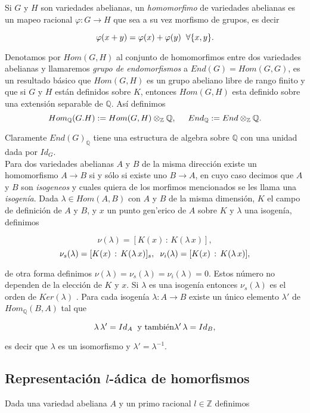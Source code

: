 \documentclass[letterpaper]{report}
\newcommand{\rac}{\ensuremath{ \mathbb Q }}
\newcommand{\dbz}{\ensuremath{ \mathbb Z }}
\begin{document}
Si $G$ y $H$ son variedades abelianas, un \textit{homomorfimo} de variedades abelianas es un mapeo racional $\varphi:G\rightarrow H$ que sea a su vez morfismo de grupos, es decir

$$\varphi(x+y)=\varphi(x)+\varphi(y)\hspace{0.2cm}\forall\lbrace x,y\rbrace.$$

Denotamos por $Hom(G,H)$ al conjunto de homomorfimos entre dos variedades abelianas y llamaremos \textit{grupo de endomorfismos} a $End(G) = Hom(G,G)$, es un resultado básico que $Hom(G,H)$ es un grupo abeliano libre de rango finito y que si $G$ y $H$ están definidos sobre $K$, entonces $Hom(G,H)$ esta definido sobre una extensión separable de $\rac$. Así definimos 
$$Hom_{\rac}(G.H):=Hom(G,H)\otimes_{\dbz}\rac,\hspace{0.5cm}End_{\rac}:=End\otimes_{\dbz}\rac.$$

Claramente $End(G)_{\rac}$ tiene una estructura de algebra sobre $\rac$ con una unidad dada por $Id_G$.\\

Para dos variedades abelianas $A$ y $B$ de la misma dirección existe un homomorfismo $A\rightarrow B$ si y sólo si existe uno $B\rightarrow A$, en cuyo caso decimos que $A$ y $B$ son \textit{isogeneos} y cuales quiera de los morfimos mencionados se les llama una \textit{isogenía}. Dada $\lambda\in Hom(A,B)$ con $A$ y $B$ de la misma dimensión, $K$ el campo de definición de $A$ y $B$, y $x$ un punto gen'erico de $A$ sobre $K$ y $\lambda$ una isogenía, definimos

$$\nu(\lambda)=[K(x)\,:\,K(\lambda\,x)],$$
$$\nu_s(\lambda)=[K(x)\, :\, K(\lambda\,x)]_s,\hspace{0.2cm}\nu_i(\lambda)=[K(x)\,:\,K(\lambda\,x)],$$

de otra forma definimos $\nu(\lambda)=\nu_s(\lambda)=\nu_i(\lambda)=0$. Estos número no dependen de la elección  de $K$ y $x$. Si $\lambda$ es una isogenía entonces $\nu_s(\lambda)$ es el orden de $Ker(\lambda)$ . Para cada isogenía $\lambda:A\rightarrow B$ existe un único elemento $\lambda'$ de $Hom_{\rac}(B,A)$ tal que 

$$\lambda\,\lambda'=Id_A\hspace{0.2cm}\text{y también}\lambda'\,\lambda=Id_B,$$

\noindent es decir que $\lambda$ es un isomorfismo y  $\lambda'=\lambda^{-1}$.

\subsection{Representación $l$-ádica de homorfismos} 
\noindent Dada una variedad abeliana $A$ y un primo racional $l\in\dbz$ definimos
\end{document}
